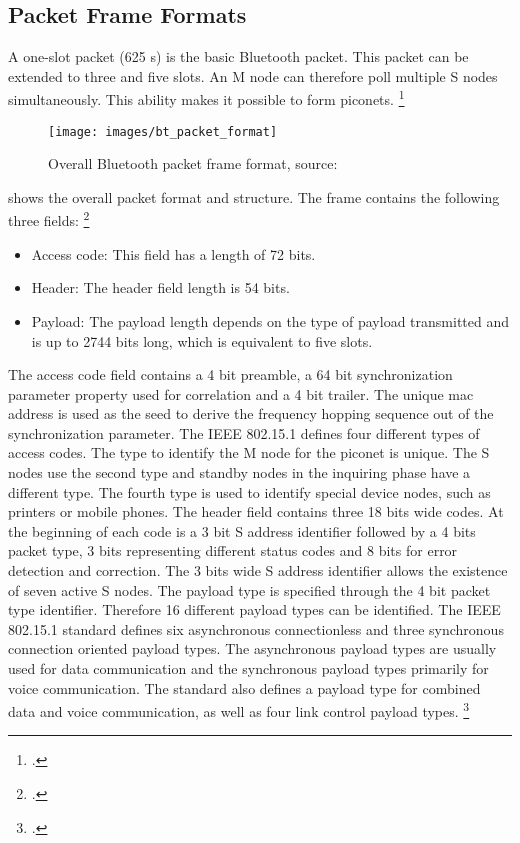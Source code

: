 \subsection{Packet Frame Formats}

A one-slot packet (625 \textmu s) is the basic Bluetooth packet. This packet can be extended to three and five slots. An M node can therefore poll multiple S nodes simultaneously. This ability makes it possible to form piconets. \footcite[Cf.][452-453]{Pahlavan2009}

\begin{figure}[ht]
  \centering
  \texttt{[image: images/bt\_packet\_format]}
  \caption{Overall Bluetooth packet frame format, source: \cite[453]{Pahlavan2009}}
  \label{fig:bt_packet_format}
\end{figure}

 shows the overall packet format and structure. The frame contains the following three fields: \footcite[Cf.][453-454]{Pahlavan2009}

\begin{itemize}
  \item Access code: This field has a length of 72 bits.
  \item Header: The header field length is 54 bits.
  \item Payload: The payload length depends on the type of payload transmitted and is up to 2744 bits long, which is equivalent to five slots.
\end{itemize}

The access code field contains a 4 bit preamble, a 64 bit synchronization parameter property used for correlation and a 4 bit trailer. The unique \gls{mac} address is used as the seed to derive the frequency hopping sequence out of the synchronization parameter. The IEEE 802.15.1 defines four different types of access codes. The type to identify the M node for the piconet is unique. The S nodes use the second type and standby nodes in the inquiring phase have a different type. The fourth type is used to identify special device nodes, such as printers or mobile phones. The header field contains three 18 bits wide codes. At the beginning of each code is a 3 bit S address identifier followed by a 4 bits packet type, 3 bits representing different status codes and 8 bits for error detection and correction. The 3 bits wide S address identifier allows the existence of seven active S nodes. The payload type is specified through the 4 bit packet type identifier. Therefore 16 different payload types can be identified. The IEEE 802.15.1 standard defines six asynchronous connectionless and three synchronous connection oriented payload types. The asynchronous payload types are usually used for data communication and the synchronous payload types primarily for voice communication. The standard also defines a payload type for combined data and voice communication, as well as four link control payload types. \footcite[Cf.][453-454]{Pahlavan2009}

